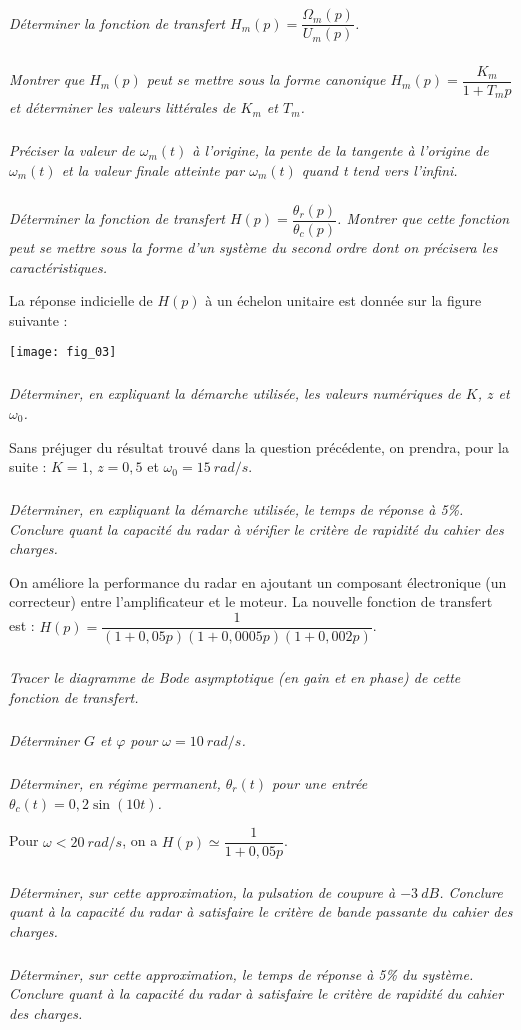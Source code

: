 \begin{multicols}{2}
\subparagraph{}\textit{Déterminer la fonction de transfert $H_m(p)=\dfrac{\Omega_m(p)}{U_m(p)}$.}

\subparagraph{}\textit{Montrer que $H_m(p)$ peut se mettre sous la forme canonique $H_m(p)=\dfrac{K_m}{1+T_m p}$ et déterminer les valeurs littérales de $K_m$ et $T_m$.}

\subparagraph{}\textit{Préciser la valeur de $\omega_m (t)$ à l'origine, la pente de la tangente à l'origine de $\omega_m (t)$ et la valeur finale atteinte par $\omega_m (t)$ quand t tend vers l’infini. }

\subparagraph{}\textit{Déterminer la fonction de transfert $H(p)=\dfrac{\theta_r(p)}{\theta_c(p)}$. Montrer que cette fonction peut se mettre sous la forme d'un système du second ordre dont on précisera les caractéristiques.}

  La réponse indicielle de $H(p)$ à un échelon unitaire est donnée sur la figure suivante : 
  
\begin{center}
\texttt{[image: fig\_03]}
\end{center}


\subparagraph{}\textit{Déterminer, en expliquant la démarche utilisée, les valeurs numériques de $K$, $z$ et $\omega_0$.}

   Sans préjuger du résultat trouvé dans la question précédente, on prendra, pour la suite : $K = 1$, $z = 0,5$ et $\omega_0 = \SI{15}{rad/s}$.


\subparagraph{}\textit{Déterminer, en expliquant la démarche utilisée, le temps de réponse à 5\%. Conclure quant la capacité du radar à vérifier le critère de rapidité du cahier des charges. }

On améliore la performance du radar en ajoutant un composant électronique (un correcteur) entre l'amplificateur et le moteur. La nouvelle fonction de transfert est : 
$
H(p)=\dfrac{1}{\left(1+0,05p \right)\left(1+0,0005p \right)\left(1+0,002p \right)}
$.
 

\subparagraph{}\textit{Tracer le diagramme de Bode asymptotique (en gain et en phase) de cette fonction de transfert.}

\subparagraph{}\textit{Déterminer $G$ et $\varphi$ pour $\omega = \SI{10}{rad/s}$.}
\subparagraph{}\textit{Déterminer, en régime permanent, $\theta_r (t)$ pour une entrée $\theta_c (t) = 0,2 \sin(10t)$.}

Pour $\omega < \SI{20}{rad/s}$, on a $H(p)\simeq \dfrac{1}{1+0,05p}$.

\subparagraph{}\textit{Déterminer, sur cette approximation, la pulsation de coupure à $-\SI{3}{dB}$. Conclure quant à la capacité du radar à satisfaire le critère de bande passante du cahier des charges.  }

\subparagraph{}\textit{Déterminer, sur cette approximation, le temps de réponse à 5\% du système. Conclure quant à la capacité du radar à satisfaire le critère de rapidité du cahier des charges. }

\end{multicols}


